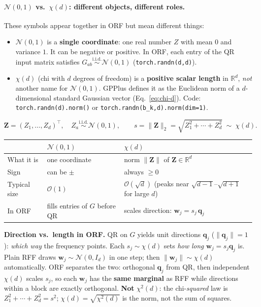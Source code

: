 \documentclass[11pt]{article}
\begin{document}
\paragraph{$\mathcal{N}(0,1)$ vs.\ $\chi(d)$: different objects, different roles.}
\label{par:n-vs-chi}
These symbols appear together in ORF but mean different things:
\begin{itemize}[nosep]
  \item \textbf{$\mathcal{N}(0,1)$} is a \textbf{single coordinate}: one real number $Z$ with mean $0$ and variance $1$.
        It can be negative or positive.
        In ORF, each entry of the QR input matrix satisfies $G_{ab}\stackrel{\text{i.i.d.}}{\sim}\mathcal N(0,1)$
        (\texttt{torch.randn(d,d)}).
  \item \textbf{$\chi(d)$} (chi with $d$ degrees of freedom) is a \textbf{positive scalar length} in $\mathbb{R}^d$,
        \emph{not} another name for $\mathcal N(0,1)$.
        GPPlus defines it as the Euclidean norm of a $d$-dimensional standard Gaussian vector
        (Eq.~\eqref{eq:chi-d}).
        Code: \texttt{torch.randn(d).norm()} or \texttt{torch.randn(b\_k,d).norm(dim=1)}.
\end{itemize}
\begin{equation}
  \label{eq:chi-d}
  \mathbf Z = (Z_1,\ldots,Z_d)^{\top},\quad
  Z_a \stackrel{\text{i.i.d.}}{\sim} \mathcal N(0,1),
  \qquad
  s = \|\mathbf Z\|_2 = \sqrt{Z_1^2 + \cdots + Z_d^2}
  \;\sim\; \chi(d).
\end{equation}
\begin{center}
\renewcommand{\arraystretch}{1.25}
\begin{tabular}{@{}lll@{}}
\toprule
 & \textbf{$\mathcal{N}(0,1)$} & \textbf{$\chi(d)$} \\
\midrule
What it is & one coordinate & norm $\|\mathbf Z\|$ of $\mathbf Z\in\mathbb{R}^d$ \\
Sign & can be $\pm$ & always $\ge 0$ \\
Typical size & $\mathcal O(1)$ & $\mathcal O(\sqrt{d})$ (peaks near $\sqrt{d-1}$--$\sqrt{d+1}$ for large $d$) \\
In ORF & fills entries of $G$ before QR & scales direction: $\mathbf w_j = s_j\,\mathbf q_j$ \\
\bottomrule
\end{tabular}
\end{center}
\textbf{Direction vs.\ length in ORF.} QR on $G$ yields unit directions $\mathbf q_j$ ($\|\mathbf q_j\|=1$): \emph{which way} the frequency points.
Each $s_j\sim\chi(d)$ sets \emph{how long} $\mathbf w_j=s_j\mathbf q_j$ is.
Plain RFF draws $\mathbf w_j\sim\mathcal N(0,I_d)$ in one step; then $\|\mathbf w_j\|\sim\chi(d)$ automatically.
ORF separates the two: orthogonal $\mathbf q_j$ from QR, then independent $\chi(d)$ scales $s_j$, so each $\mathbf w_j$ has the
\textbf{same marginal} as RFF while directions within a block are exactly orthogonal.
\textbf{Not} $\chi^2(d)$: the chi-\emph{squared} law is $Z_1^2+\cdots+Z_d^2=s^2$; $\chi(d)=\sqrt{\chi^2(d)}$ is the norm, not the sum of squares.
\end{document}

